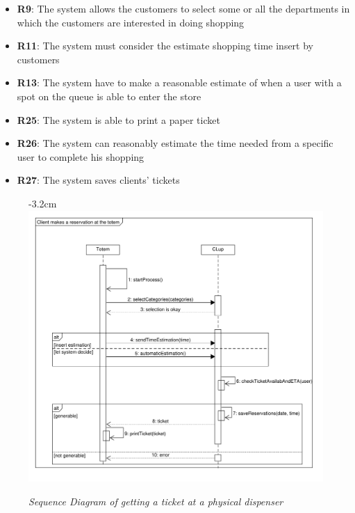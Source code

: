 \documentclass{article}
\begin{document}
\begin{center}
\begin{adjustwidth}{-3cm}{}
\begin{tabular}[h!]{|m{7.5em}|m{36em}|}
						\end{tabular}

					\end{adjustwidth}
				
					\begin{itemize}
					\bigskip
					\bigskip
					\bigskip
					\bigskip
					{\bfseries Required functional requirements: }
					
					
					\item {\bfseries R9}: The system allows the customers to select some or all the departments in which the customers are interested in doing shopping
					\item {\bfseries R11}: The system must consider the estimate shopping time insert
					by customers
					\item {\bfseries R13}: The system have to make a reasonable estimate of when a user with a spot on the queue is able to enter the store
					\item {\bfseries R25}: The system is able to print a paper ticket
					\item {\bfseries R26}: The system can reasonably estimate the time needed from a specific user to complete his shopping
					\item {\bfseries R27}: The system saves clients' tickets

				\end{itemize}
					\begin{figure}[!htb]
						\begin{adjustwidth} {-3.2cm}{}
							\centering
							\includegraphics[scale=0.62]{SD/11_getTicketAtTotem.pdf}\\
							\caption{\emph{Sequence Diagram of getting a ticket at a physical dispenser}}
						\end{adjustwidth}
					\end{figure}
				\end{center}
			\newpage
\end{document}

